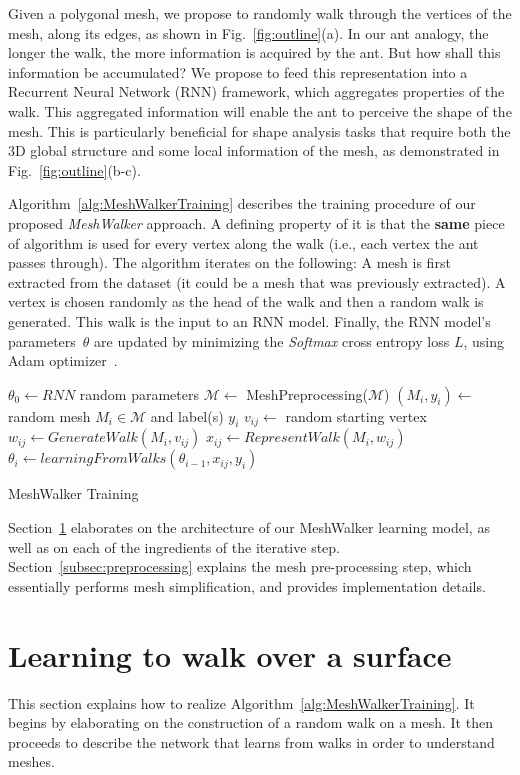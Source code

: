 \documentclass[acmtog]{acmart}
\begin{document}
Given a polygonal mesh, we propose to randomly walk through the vertices of the mesh, along its edges,
as shown in Fig.~\ref{fig:outline}(a).
In our ant analogy, the longer the walk, the more information is acquired by the ant.
But how shall this information be accumulated?
We propose to feed this representation into a Recurrent Neural Network (RNN) framework, which aggregates properties of the walk.
This aggregated information will enable the ant to perceive the shape of the mesh.
This is particularly beneficial for shape analysis tasks that require both the 3D global structure and some local information of the mesh, as demonstrated in Fig.~\ref{fig:outline}(b-c).

Algorithm~\ref{alg:MeshWalkerTraining} describes the training procedure of our proposed {\em MeshWalker} approach. 
A defining property of it is that the \textbf{same} piece of algorithm is used for every vertex along the walk (i.e., each vertex the ant passes through).
The algorithm  iterates on the following:
A mesh is first extracted from the dataset (it could be a mesh that was previously extracted).
A vertex is chosen randomly as the head of the walk and then a random walk is generated.
This walk is the input to an RNN model.
Finally, the RNN model's parameters~$\theta$ are updated by minimizing the {\em Softmax} cross entropy loss $L$, using Adam optimizer~\cite{kingma2014adam}. 

\begin{algorithm}[t]
\SetAlgoNoLine
{}
$\theta_0 \gets RNN$ random parameters\;
$\mathcal{M} \gets$ MeshPreprocessing($\mathcal{M}$)\;
    {
        $(M_i, y_i) \gets$ random mesh $M_i  \in \mathcal{M}$ and label(s) $y_i$\;
        $v_{ij} \gets$ random starting vertex\;
        ${w_{ij} \gets GenerateWalk(M_i, v_{ij})}$\;
        ${x}_{ij} \gets RepresentWalk(M_i, w_{ij})$\;
$\theta_i \gets learningFromWalks(\theta_{i-1}, {x}_{ij}, y_i)$\;
    }
\caption{MeshWalker Training}
\label{alg:MeshWalkerTraining}
\end{algorithm}


Section~\ref{sec:model} elaborates on the architecture of our MeshWalker learning model, as well as on each of the  ingredients of the iterative step.
Section~\ref{subsec:preprocessing} explains the mesh pre-processing step, which essentially performs mesh simplification, and provides implementation details.

\section{Learning to walk over a surface}
\label{sec:model}
This section explains how to realize Algorithm~\ref{alg:MeshWalkerTraining}.
It begins by elaborating on the construction of a random walk on a mesh.
It then proceeds to describe the network that learns from walks in order to understand meshes.
\end{document}

